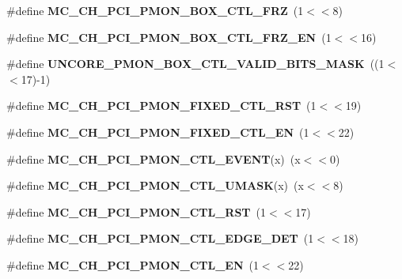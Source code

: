 \begin{DoxyCompactItemize}
\item 
\#define {\bfseries M\+C\+\_\+\+C\+H\+\_\+\+P\+C\+I\+\_\+\+P\+M\+O\+N\+\_\+\+B\+O\+X\+\_\+\+C\+T\+L\+\_\+\+F\+RZ}~(1$<$$<$8)\label{types_8h_a2d4b33ec94e8fe5aa98725bfc7f6a094}

\item 
\#define {\bfseries M\+C\+\_\+\+C\+H\+\_\+\+P\+C\+I\+\_\+\+P\+M\+O\+N\+\_\+\+B\+O\+X\+\_\+\+C\+T\+L\+\_\+\+F\+R\+Z\+\_\+\+EN}~(1$<$$<$16)\label{types_8h_aa2aaad26e22dcd5bf0f5af5b1df2f83b}

\item 
\#define {\bfseries U\+N\+C\+O\+R\+E\+\_\+\+P\+M\+O\+N\+\_\+\+B\+O\+X\+\_\+\+C\+T\+L\+\_\+\+V\+A\+L\+I\+D\+\_\+\+B\+I\+T\+S\+\_\+\+M\+A\+SK}~((1$<$$<$17)-\/1)\label{types_8h_a6cb428bc4605cf2a315ca40251a1215b}

\item 
\#define {\bfseries M\+C\+\_\+\+C\+H\+\_\+\+P\+C\+I\+\_\+\+P\+M\+O\+N\+\_\+\+F\+I\+X\+E\+D\+\_\+\+C\+T\+L\+\_\+\+R\+ST}~(1$<$$<$19)\label{types_8h_a7d8d0f63d5190fc4c196e723611e8790}

\item 
\#define {\bfseries M\+C\+\_\+\+C\+H\+\_\+\+P\+C\+I\+\_\+\+P\+M\+O\+N\+\_\+\+F\+I\+X\+E\+D\+\_\+\+C\+T\+L\+\_\+\+EN}~(1$<$$<$22)\label{types_8h_ae84422faffd5e02c7bda77fb3c26ad22}

\item 
\#define {\bfseries M\+C\+\_\+\+C\+H\+\_\+\+P\+C\+I\+\_\+\+P\+M\+O\+N\+\_\+\+C\+T\+L\+\_\+\+E\+V\+E\+NT}(x)~(x$<$$<$0)\label{types_8h_a97155caecb2f1f1f353e205519c887de}

\item 
\#define {\bfseries M\+C\+\_\+\+C\+H\+\_\+\+P\+C\+I\+\_\+\+P\+M\+O\+N\+\_\+\+C\+T\+L\+\_\+\+U\+M\+A\+SK}(x)~(x$<$$<$8)\label{types_8h_af9a380752ec95177a22919f6acea5c24}

\item 
\#define {\bfseries M\+C\+\_\+\+C\+H\+\_\+\+P\+C\+I\+\_\+\+P\+M\+O\+N\+\_\+\+C\+T\+L\+\_\+\+R\+ST}~(1$<$$<$17)\label{types_8h_a1151645ee0197931e91ea8f8761f14ba}

\item 
\#define {\bfseries M\+C\+\_\+\+C\+H\+\_\+\+P\+C\+I\+\_\+\+P\+M\+O\+N\+\_\+\+C\+T\+L\+\_\+\+E\+D\+G\+E\+\_\+\+D\+ET}~(1$<$$<$18)\label{types_8h_a85da56ce7f41dd054fbc56d29ed163e8}

\item 
\#define {\bfseries M\+C\+\_\+\+C\+H\+\_\+\+P\+C\+I\+\_\+\+P\+M\+O\+N\+\_\+\+C\+T\+L\+\_\+\+EN}~(1$<$$<$22)\label{types_8h_afcd945a25e7fd6fdd56db22f85f3dd45}


\end{DoxyCompactItemize}
